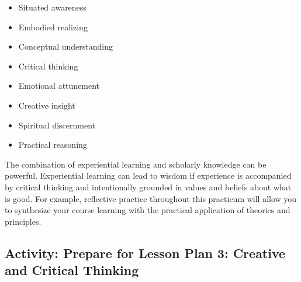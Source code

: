 \documentclass[
]{book}
\providecommand{\tightlist}{%
  \setlength{\itemsep}{0pt}\setlength{\parskip}{0pt}}
\begin{document}
\begin{itemize}
\tightlist
\item
  Situated awareness\\
\item
  Embodied realizing\\
\item
  Conceptual understanding\\
\item
  Critical thinking\\
\item
  Emotional attunement\\
\item
  Creative insight\\
\item
  Spiritual discernment\\
\item
  Practical reasoning
\end{itemize}

The combination of experiential learning and scholarly knowledge can be powerful. Experiential learning can lead to wisdom if experience is accompanied by critical thinking and intentionally grounded in values and beliefs about what is good. For example, reflective practice throughout this practicum will allow you to synthesize your course learning with the practical application of theories and principles.

\hypertarget{activity-prepare-for-lesson-plan-3-creative-and-critical-thinking}{%
\subsection{Activity: Prepare for Lesson Plan 3: Creative and Critical Thinking}\label{activity-prepare-for-lesson-plan-3-creative-and-critical-thinking}}
\end{document}
